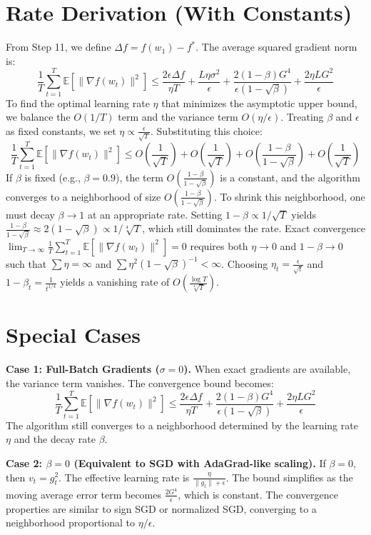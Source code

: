 \documentclass{article}
\begin{document}
\section*{Rate Derivation (With Constants)}
From Step 11, we define $\Delta f = f(w_1) - f^*$. The average squared gradient norm is:
$$ \frac{1}{T} \sum_{t=1}^T \mathbb{E}[\|\nabla f(w_t)\|^2] \leq \frac{2\epsilon \Delta f}{\eta T} + \frac{L\eta\sigma^2}{\epsilon} + \frac{2(1-\beta)G^4}{\epsilon(1-\sqrt{\beta})} + \frac{2\eta L G^2}{\epsilon} $$
To find the optimal learning rate $\eta$ that minimizes the asymptotic upper bound, we balance the $O(1/T)$ term and the variance term $O(\eta/\epsilon)$. Treating $\beta$ and $\epsilon$ as fixed constants, we set $\eta \propto \frac{\epsilon}{\sqrt{T}}$. Substituting this choice:
$$ \frac{1}{T} \sum_{t=1}^T \mathbb{E}[\|\nabla f(w_t)\|^2] \leq O\left(\frac{1}{\sqrt{T}}\right) + O\left(\frac{1}{\sqrt{T}}\right) + O\left(\frac{1-\beta}{1-\sqrt{\beta}}\right) + O\left(\frac{1}{\sqrt{T}}\right) $$
If $\beta$ is fixed (e.g., $\beta = 0.9$), the term $O\left(\frac{1-\beta}{1-\sqrt{\beta}}\right)$ is a constant, and the algorithm converges to a neighborhood of size $O\left(\frac{1-\beta}{1-\sqrt{\beta}}\right)$. To shrink this neighborhood, one must decay $\beta \to 1$ at an appropriate rate. Setting $1-\beta \propto 1/\sqrt{T}$ yields $\frac{1-\beta}{1-\sqrt{\beta}} \approx 2(1-\sqrt{\beta}) \propto 1/\sqrt[4]{T}$, which still dominates the rate. Exact convergence $\lim_{T \to \infty} \frac{1}{T} \sum_{t=1}^T \mathbb{E}[\|\nabla f(w_t)\|^2] = 0$ requires both $\eta \to 0$ and $1-\beta \to 0$ such that $\sum \eta = \infty$ and $\sum \eta^2 (1-\sqrt{\beta})^{-1} < \infty$. Choosing $\eta_t = \frac{\epsilon}{\sqrt{t}}$ and $1-\beta_t = \frac{1}{t^{1/4}}$ yields a vanishing rate of $O\left(\frac{\log T}{\sqrt[4]{T}}\right)$.

\section*{Special Cases}
\textbf{Case 1: Full-Batch Gradients ($\sigma = 0$).} When exact gradients are available, the variance term vanishes. The convergence bound becomes:
$$ \frac{1}{T} \sum_{t=1}^T \mathbb{E}[\|\nabla f(w_t)\|^2] \leq \frac{2\epsilon \Delta f}{\eta T} + \frac{2(1-\beta)G^4}{\epsilon(1-\sqrt{\beta})} + \frac{2\eta L G^2}{\epsilon} $$
The algorithm still converges to a neighborhood determined by the learning rate $\eta$ and the decay rate $\beta$.

\textbf{Case 2: $\beta = 0$ (Equivalent to SGD with AdaGrad-like scaling).} If $\beta = 0$, then $v_t = g_t^2$. The effective learning rate is $\frac{\eta}{\|g_t\| + \epsilon}$. The bound simplifies as the moving average error term becomes $\frac{2G^4}{\epsilon}$, which is constant. The convergence properties are similar to sign SGD or normalized SGD, converging to a neighborhood proportional to $\eta/\epsilon$.
\end{document}
